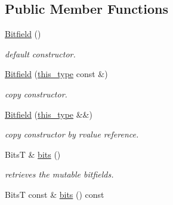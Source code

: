 \subsection*{Public Member Functions}
\begin{DoxyCompactItemize}
\item 
\hypertarget{classhryky_1_1_bitfield_abfb50271df7f7488c79371587846da92}{\hyperlink{classhryky_1_1_bitfield_abfb50271df7f7488c79371587846da92}{Bitfield} ()}\label{classhryky_1_1_bitfield_abfb50271df7f7488c79371587846da92}

\begin{DoxyCompactList}\small\item\em default constructor. \end{DoxyCompactList}\item 
\hypertarget{classhryky_1_1_bitfield_a3a77f4b3ee8805ee6f7b23e2fa800313}{\hyperlink{classhryky_1_1_bitfield_a3a77f4b3ee8805ee6f7b23e2fa800313}{Bitfield} (\hyperlink{classhryky_1_1_bitfield_a92159139a91a26878ed5293d99024434}{this\-\_\-type} const \&)}\label{classhryky_1_1_bitfield_a3a77f4b3ee8805ee6f7b23e2fa800313}

\begin{DoxyCompactList}\small\item\em copy constructor. \end{DoxyCompactList}\item 
\hypertarget{classhryky_1_1_bitfield_aa1e9cb12f22dc0038dd8c0775960809b}{\hyperlink{classhryky_1_1_bitfield_aa1e9cb12f22dc0038dd8c0775960809b}{Bitfield} (\hyperlink{classhryky_1_1_bitfield_a92159139a91a26878ed5293d99024434}{this\-\_\-type} \&\&)}\label{classhryky_1_1_bitfield_aa1e9cb12f22dc0038dd8c0775960809b}

\begin{DoxyCompactList}\small\item\em copy constructor by rvalue reference. \end{DoxyCompactList}\item 
\hypertarget{classhryky_1_1_bitfield_a04c5998228b1907cfa497108df297175}{Bits\-T \& \hyperlink{classhryky_1_1_bitfield_a04c5998228b1907cfa497108df297175}{bits} ()}\label{classhryky_1_1_bitfield_a04c5998228b1907cfa497108df297175}

\begin{DoxyCompactList}\small\item\em retrieves the mutable bitfields. \end{DoxyCompactList}\item 
\hypertarget{classhryky_1_1_bitfield_a3a0f981d38a144f6f8332f47e9da5496}{Bits\-T const \& \hyperlink{classhryky_1_1_bitfield_a3a0f981d38a144f6f8332f47e9da5496}{bits} () const }\label{classhryky_1_1_bitfield_a3a0f981d38a144f6f8332f47e9da5496}


\end{DoxyCompactItemize}
